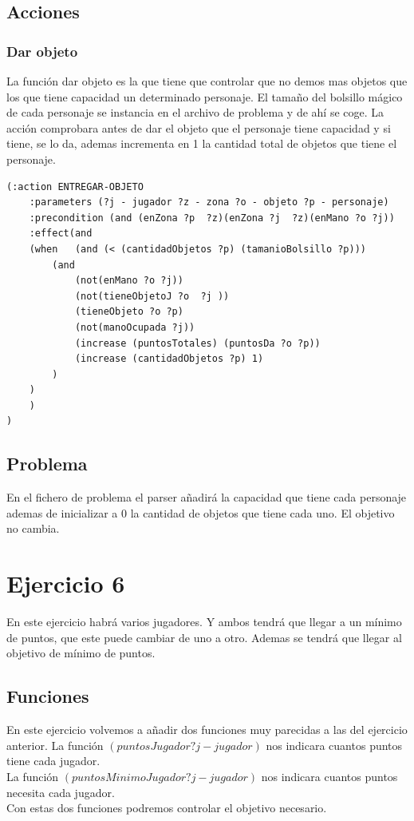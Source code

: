 \documentclass[12pt,a4paper]{article}
\begin{document}
\subsection{Acciones}
\subsubsection{Dar objeto}
La función dar objeto es la que tiene que controlar que no demos mas objetos que los que tiene capacidad un determinado personaje. El tamaño del bolsillo mágico de cada personaje se instancia en el archivo de problema y de ahí se coge. La acción comprobara antes de dar el objeto que el personaje tiene capacidad y si tiene, se lo da, ademas incrementa en 1 la cantidad total de objetos que tiene el personaje.  
\begin{lstlisting}
(:action ENTREGAR-OBJETO
	:parameters (?j - jugador ?z - zona ?o - objeto ?p - personaje)
	:precondition (and (enZona ?p  ?z)(enZona ?j  ?z)(enMano ?o ?j))
	:effect(and 
	(when	(and (< (cantidadObjetos ?p) (tamanioBolsillo ?p)))
		(and
			(not(enMano ?o ?j))
			(not(tieneObjetoJ ?o  ?j ))
			(tieneObjeto ?o ?p)
			(not(manoOcupada ?j))
			(increase (puntosTotales) (puntosDa ?o ?p))
			(increase (cantidadObjetos ?p) 1)
		)
	)
	)
)
\end{lstlisting}
\subsection{Problema}
En el fichero de problema el parser añadirá la capacidad que tiene cada personaje ademas de inicializar a 0 la cantidad de objetos que tiene cada uno. El objetivo no cambia.
\section{Ejercicio 6}
En este ejercicio habrá varios jugadores. Y ambos tendrá que llegar a un mínimo de puntos, que este puede cambiar de uno a otro. Ademas se tendrá que llegar al objetivo de mínimo de puntos. 
\subsection{Funciones}
En este ejercicio volvemos a añadir dos funciones muy parecidas a las del ejercicio anterior. 
La función $(puntosJugador ?j - jugador)$ nos indicara cuantos puntos tiene cada jugador.\\
La función $(puntosMinimoJugador ?j - jugador)$ nos indicara cuantos puntos necesita cada jugador.\\
Con estas dos funciones podremos controlar el objetivo necesario.
\end{document}
